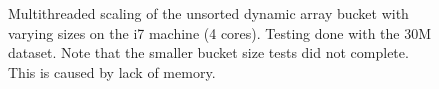 \begin{landscape}
\begin{figure}[H]
{    }
    \label{fig:ts_i7_30m_unsorted}
    \caption{Multithreaded scaling of the unsorted dynamic array bucket with varying sizes on the
    i7 machine (4 cores). Testing done with the 30M dataset. Note that the smaller bucket size tests did not complete. This is caused by lack of memory.}
\end{figure}
\begin{figure}[H]
\end{figure}
\end{landscape}
